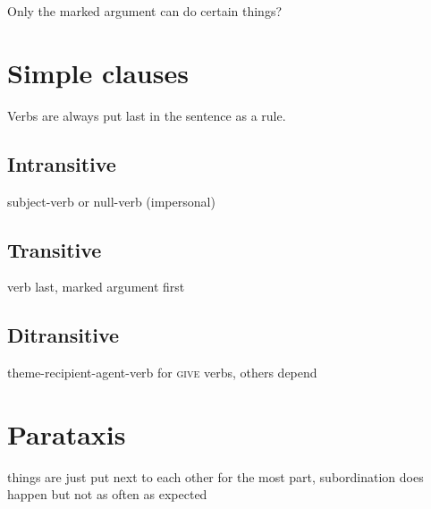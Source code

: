 \documentclass[smallroyalvopaper,9pt]{memoir}
\begin{document}
Only the marked argument can do certain things?

\section{Simple clauses}

Verbs are always put last in the sentence as a rule. 

\subsection{Intransitive}

subject-verb or null-verb (impersonal)

\subsection{Transitive}

verb last, marked argument first

\subsection{Ditransitive}

theme-recipient-agent-verb for \textsc{give} verbs, others depend

\section{Parataxis}

things are just put next to each other for the most part, subordination does happen but not as often as expected
\end{document}
